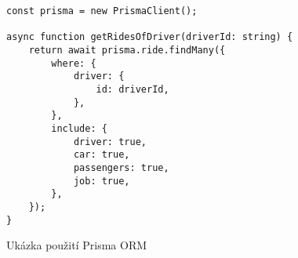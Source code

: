 \begin{listing}[h]
\begin{verbatim}
const prisma = new PrismaClient();

async function getRidesOfDriver(driverId: string) {
    return await prisma.ride.findMany({
        where: {    
            driver: {
                id: driverId,
            },
        },
        include: {
            driver: true,
            car: true,
            passengers: true,
            job: true,
        },
    });
}
\end{verbatim}
\caption{Ukázka použití Prisma ORM}
\label{fig:prisma-query}
\end{listing}